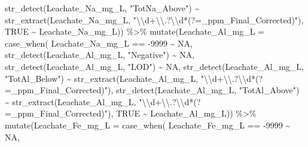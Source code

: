 \documentclass[
]{article}
\newenvironment{Shaded}{\begin{snugshade}}{\end{snugshade}}
\newcommand{\AttributeTok}[1]{\textcolor[rgb]{0.77,0.63,0.00}{#1}}
\newcommand{\ConstantTok}[1]{\textcolor[rgb]{0.00,0.00,0.00}{#1}}
\newcommand{\DecValTok}[1]{\textcolor[rgb]{0.00,0.00,0.81}{#1}}
\newcommand{\FunctionTok}[1]{\textcolor[rgb]{0.00,0.00,0.00}{#1}}
\newcommand{\NormalTok}[1]{#1}
\newcommand{\SpecialCharTok}[1]{\textcolor[rgb]{0.00,0.00,0.00}{#1}}
\newcommand{\StringTok}[1]{\textcolor[rgb]{0.31,0.60,0.02}{#1}}
\begin{document}
\begin{Shaded}
\begin{Highlighting}[]
                \FunctionTok{str\_detect}\NormalTok{(Leachate\_Na\_mg\_L, }\StringTok{"TotNa\_Above"}\NormalTok{) }\SpecialCharTok{\textasciitilde{}} 
                \FunctionTok{str\_extract}\NormalTok{(Leachate\_Na\_mg\_L, }\StringTok{"}\SpecialCharTok{\textbackslash{}\textbackslash{}}\StringTok{d+}\SpecialCharTok{\textbackslash{}\textbackslash{}}\StringTok{.?}\SpecialCharTok{\textbackslash{}\textbackslash{}}\StringTok{d*(?=\_ppm\_Final\_Corrected)"}\NormalTok{),}
                \ConstantTok{TRUE} \SpecialCharTok{\textasciitilde{}}\NormalTok{ Leachate\_Na\_mg\_L)) }\SpecialCharTok{\%\textgreater{}\%}
  \FunctionTok{mutate}\NormalTok{(}\AttributeTok{Leachate\_Al\_mg\_L =} \FunctionTok{case\_when}\NormalTok{(}
\NormalTok{                Leachate\_Na\_mg\_L }\SpecialCharTok{==} \SpecialCharTok{{-}}\DecValTok{9999} \SpecialCharTok{\textasciitilde{}} \ConstantTok{NA}\NormalTok{,}
                \FunctionTok{str\_detect}\NormalTok{(Leachate\_Al\_mg\_L, }\StringTok{"Negative"}\NormalTok{) }\SpecialCharTok{\textasciitilde{}} \ConstantTok{NA}\NormalTok{, }
                \FunctionTok{str\_detect}\NormalTok{(Leachate\_Al\_mg\_L, }\StringTok{"LOD"}\NormalTok{) }\SpecialCharTok{\textasciitilde{}} \ConstantTok{NA}\NormalTok{, }
                \FunctionTok{str\_detect}\NormalTok{(Leachate\_Al\_mg\_L, }\StringTok{"TotAl\_Below"}\NormalTok{) }\SpecialCharTok{\textasciitilde{}} 
                \FunctionTok{str\_extract}\NormalTok{(Leachate\_Al\_mg\_L, }\StringTok{"}\SpecialCharTok{\textbackslash{}\textbackslash{}}\StringTok{d+}\SpecialCharTok{\textbackslash{}\textbackslash{}}\StringTok{.?}\SpecialCharTok{\textbackslash{}\textbackslash{}}\StringTok{d*(?=\_ppm\_Final\_Corrected)"}\NormalTok{),}
                \FunctionTok{str\_detect}\NormalTok{(Leachate\_Al\_mg\_L, }\StringTok{"TotAl\_Above"}\NormalTok{) }\SpecialCharTok{\textasciitilde{}} 
                \FunctionTok{str\_extract}\NormalTok{(Leachate\_Al\_mg\_L, }\StringTok{"}\SpecialCharTok{\textbackslash{}\textbackslash{}}\StringTok{d+}\SpecialCharTok{\textbackslash{}\textbackslash{}}\StringTok{.?}\SpecialCharTok{\textbackslash{}\textbackslash{}}\StringTok{d*(?=\_ppm\_Final\_Corrected)"}\NormalTok{),}
                \ConstantTok{TRUE} \SpecialCharTok{\textasciitilde{}}\NormalTok{ Leachate\_Al\_mg\_L)) }\SpecialCharTok{\%\textgreater{}\%}
  \FunctionTok{mutate}\NormalTok{(}\AttributeTok{Leachate\_Fe\_mg\_L =} \FunctionTok{case\_when}\NormalTok{(}
\NormalTok{                Leachate\_Fe\_mg\_L }\SpecialCharTok{==} \SpecialCharTok{{-}}\DecValTok{9999} \SpecialCharTok{\textasciitilde{}} \ConstantTok{NA}\NormalTok{,}

\end{Highlighting}
\end{Shaded}
\end{document}
